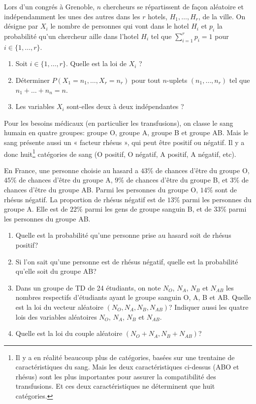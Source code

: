 \documentclass[a4paper,12pt,reqno]{amsart}
\begin{document}
\begin{exo}

  Lors d'un congrés à Grenoble, $n$ chercheurs se répartissent de façon aléatoire et indépendamment les unes des autres  dans les $r$ hotels, $H_1,\ldots,H_r$, de la ville. On désigne par $X_i$ le nombre de personnes qui vont dans le hotel $H_i$ et $p_i$ la probabilité qu'un chercheur aille dans l'hotel $H_i$ tel que $\sum_{i=1}^rp_i=1$ pour $i\in\{1,\ldots,r\}$.
  \begin{enumerate}
    \item Soit $i\in\{1,\ldots,r\}$. Quelle est la loi de $X_i$ ?
    \item Déterminer  $P(X_1=n_1,\ldots,X_r=n_r)$ pour tout $n$-uplets $(n_1,\ldots,n_r)$ tel que $n_1+\ldots +n_n=n$.
    \item Les variables $X_i$ sont-elles deux à deux indépendantes ?
  \end{enumerate}

\end{exo}

\begin{exo}

  Pour les besoins médicaux (en particulier les transfusions), on classe le sang humain en quatre groupes: groupe O, groupe A, groupe B et groupe AB. Mais le sang présente aussi un « facteur rhésus », qui peut être positif ou négatif. Il y a donc huit\footnote{Il y a en réalité beaucoup plus de catégories, basées sur une trentaine de caractéristiques du sang. Mais les deux caractéristiques ci-dessus (ABO et rhésus) sont les plus importantes pour assurer la compatibilité des transfusions. Et ces deux caractéristiques ne déterminent que huit catégories.} catégories de sang (O positif, O négatif, A positif, A négatif, etc).

  En France, une personne choisie au hasard a $43\%$ de chances d'être du groupe O, $45\%$ de chances d'être du groupe A, $9\%$ de chances d'être du groupe B, et $3\%$ de chances d'être du groupe AB.
  Parmi les personnes du groupe O, $14\%$ sont de rhésus négatif. La proportion de rhésus négatif est de $13\%$ parmi les personnes du groupe A. Elle est de $22\%$ parmi les gens de groupe sanguin B, et de $33\%$ parmi les personnes du groupe AB.
  \begin{enumerate}
    \item Quelle est la probabilité qu'une personne prise au hasard soit de rhésus positif?
    \item Si l'on sait qu'une personne est de rhésus négatif, quelle est la probabilité qu'elle soit du groupe AB?
    \item Dans un groupe de TD de 24 étudiants, on note $N_O$, $N_A$, $N_B$ et $N_{AB}$ les nombres respectifs d'étudiants ayant le groupe sanguin O, A, B et AB. Quelle est la loi du vecteur aléatoire  $(N_O,N_A,N_B,N_{AB})$? Indiquer aussi les quatre lois des variables aléatoires $N_O$, $N_A$, $N_B$ et $N_{AB}$.
    \item Quelle est la loi du couple aléatoire $(N_O+N_A,N_B+N_{AB})$?
  \end{enumerate}
\end{exo}
\end{document}
